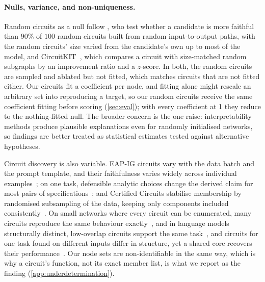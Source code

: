 \documentclass[10pt]{article}
\begin{document}
\paragraph{Nulls, variance, and non-uniqueness.}
Random circuits as a null follow \citet{shi2024hypothesis}, who test whether a candidate is more faithful than $90\%$ of $100$ random circuits built from random input-to-output paths, with the random circuits' size varied from the candidate's own up to most of the model, and CircuitKIT~\citep{seth2026circuitkit}, which compares a circuit with size-matched random subgraphs by an improvement ratio and a $z$-score.
In both, the random circuits are sampled and ablated but not fitted, which matches circuits that are not fitted either.
Our circuits fit a coefficient per node, and fitting alone might rescale an arbitrary set into reproducing a target, so our random circuits receive the same coefficient fitting before scoring (\cref{sec:eval}); with every coefficient at 1 they reduce to the nothing-fitted null.
The broader concern is the one \citet{meloux2025dead} raise: interpretability methods produce plausible explanations even for randomly initialised networks, so findings are better treated as statistical estimates tested against alternative hypotheses.

Circuit discovery is also variable.
EAP-IG circuits vary with the data batch and the prompt template, and their faithfulness varies widely across individual examples~\citep{wu2026demystifying}; on one task, defensible analytic choices change the derived claim for most pairs of specifications~\citep{mahale2026explanation}; and Certified Circuits stabilise membership by randomised subsampling of the data, keeping only components included consistently~\citep{anani2026certified}.
On small networks where every circuit can be enumerated, many circuits reproduce the same behaviour exactly~\citep{meloux2025everything}, and in language models structurally distinct, low-overlap circuits support the same task~\citep{chen2026rome}, and circuits for one task found on different inputs differ in structure, yet a shared core recovers their performance~\citep{makou2026many}.
Our node sets are non-identifiable in the same way, which is why a circuit's function, not its exact member list, is what we report as the finding (\cref{app:underdetermination}).
\end{document}

